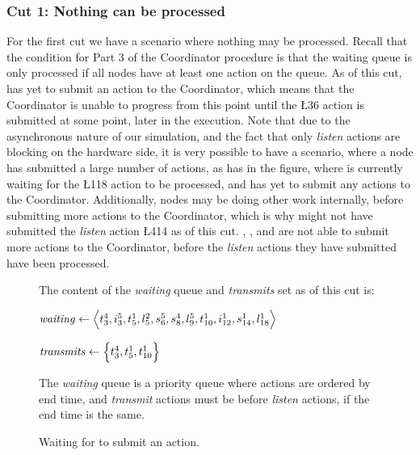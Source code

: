 \subsubsection{Cut 1: Nothing can be processed}
For the first cut we have a scenario where nothing may be processed. Recall that the condition for Part 3 of
the Coordinator procedure is that the waiting queue is only processed if all nodes have at least one action on
the queue. As of this cut,  has yet to submit an action to the Coordinator, which means that the
Coordinator is unable to progress from this point until the \L{3}{6} action is submitted at some point, later
in the execution. Note that due to the asynchronous nature of our simulation, and the fact that only
\textit{listen} actions are blocking on the hardware side, it is very possible to have a scenario, where a
node has submitted a large number of actions, as  has in the figure, where  is currently
waiting for the \L{1}{18} action to be processed, and  has yet to submit any actions to the
Coordinator. Additionally, nodes may be doing other work internally, before submitting more actions to the
Coordinator, which is why  might not have submitted the \textit{listen} action \L{4}{14} as of this
cut. , , and  are not able to submit more actions to the Coordinator, before the
\textit{listen} actions they have submitted have been processed.

\begin{figure}[H]
    \caption{Waiting for  to submit an action.}\label{tikz:coordinatormsc1}
     \par

    \begin{minipage}[h]{14.5cm}
        The content of the \textit{waiting} queue and \textit{transmits} set as of this cut is: \smallbreak

        $\mathit{waiting} \leftarrow \Big\langle t^{4}_{3}, i^{5}_{3}, t^{1}_{5}, l^{2}_{5}, s^{5}_{6}, s^{4}_{8},
            l^{5}_{9}, t^{1}_{10}, i^{1}_{12}, s^{1}_{14}, l^{1}_{18} \Big\rangle$

        $\mathit{transmits} \leftarrow \Big\{ t^{4}_{3}, t^{1}_{5}, t^{1}_{10} \Big\}$ \smallbreak

        The \textit{waiting} queue is a priority queue where actions are ordered by end time, and
        \textit{transmit} actions must be before \textit{listen} actions, if the end time is the same.
    \end{minipage}
\end{figure}

